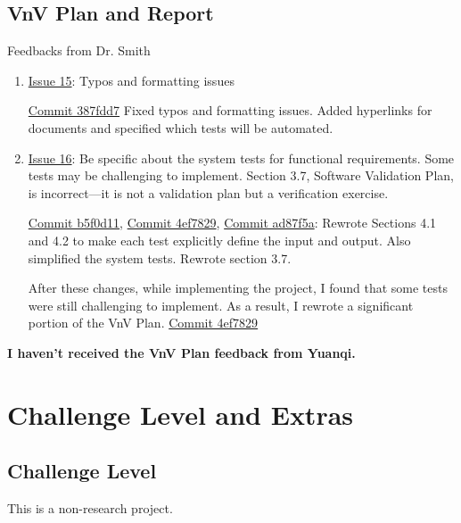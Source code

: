 \documentclass{article}
\begin{document}
\subsection{VnV Plan and Report}
Feedbacks from Dr. Smith

\begin{enumerate}
    \item \href{https://github.com/V-AS/Two-tower-recommender-system/issues/15}{Issue 15}: Typos and formatting issues
    
    \href{https://github.com/V-AS/Two-tower-recommender-system/commit/387fdd7ecc6dce5318262a72c5775bf88147ec08}{Commit 387fdd7} Fixed typos and formatting issues. Added hyperlinks for documents and specified which tests will be automated.  

    \item \href{https://github.com/V-AS/Two-tower-recommender-system/issues/16}{Issue 16}: Be specific about the system tests for functional requirements. Some tests may be challenging to implement. Section 3.7, Software Validation Plan, is incorrect—it is not a validation plan but a verification exercise.
 
    \href{https://github.com/V-AS/Two-tower-recommender-system/commit/b5f0d11daf4a2c852395552be9d2ef751c515a0f}{Commit b5f0d11}, \href{https://github.com/V-AS/Two-tower-recommender-system/commit/4ef7829f9839398cdde3757c859d094fa82e90cb#diff-8d3e9ddbf3d26cf5e2a7027bf962071598c6f3916127fdabcb800f03d22ba969}{Commit 4ef7829}, \href{https://github.com/V-AS/Two-tower-recommender-system/commit/ad87f5a9632ae4926f5eedf60d9299e422eebe47}{Commit ad87f5a}: Rewrote Sections 4.1 and 4.2 to make each test explicitly define the input and output. Also simplified the system tests. Rewrote section 3.7.

    After these changes, while implementing the project, I found that some tests were still challenging to implement. As a result, I rewrote a significant portion of the VnV Plan. \href{https://github.com/V-AS/Two-tower-recommender-system/commit/4ef7829f9839398cdde3757c859d094fa82e90cb#diff-8d3e9ddbf3d26cf5e2a7027bf962071598c6f3916127fdabcb800f03d22ba969}{Commit 4ef7829} 
\end{enumerate}
\textbf{I haven't received the VnV Plan feedback from Yuanqi.}
\section{Challenge Level and Extras}

\subsection{Challenge Level}
This is a non-research project.
\end{document}
